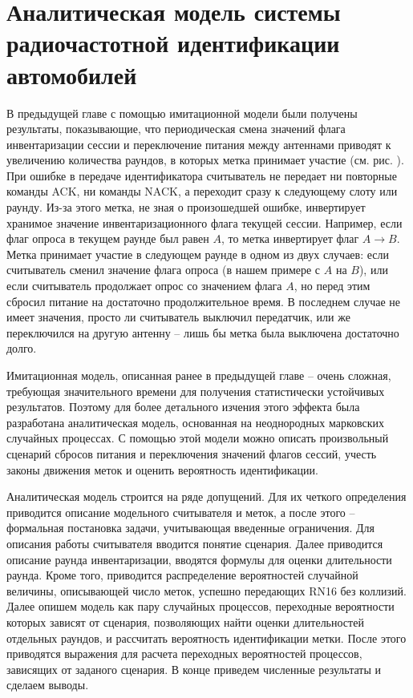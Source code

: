 \chapter{Аналитическая модель системы радиочастотной идентификации автомобилей}\label{ch:ch3}


В предыдущей главе с помощью имитационной модели были получены результаты, показывающие, что периодическая смена значений флага инвентаризации сессии и переключение питания между антеннами приводят к увеличению количества раундов, в которых метка принимает участие (см. рис. ). При ошибке в передаче идентификатора считыватель не передает ни повторные команды ACK, ни команды NACK, а переходит сразу к следующему слоту или раунду. Из-за этого метка, не зная о произошедшей ошибке, инвертирует хранимое значение инвентаризационного флага текущей сессии. Например, если флаг опроса в текущем раунде был равен $A$, то метка инвертирует флаг $A \rightarrow B$. Метка принимает участие в следующем раунде в одном из двух случаев: если считыватель сменил значение флага опроса (в нашем примере с $A$ на $B$), или если считыватель продолжает опрос со значением флага $A$, но перед этим сбросил питание на достаточно продолжительное время. В последнем случае не имеет значения, просто ли считыватель выключил передатчик, или же переключился на другую антенну -- лишь бы метка была выключена достаточно долго.

Имитационная модель, описанная ранее в предыдущей главе -- очень сложная, требующая значительного времени для получения статистически устойчивых результатов. Поэтому для более детального изчения этого эффекта была разработана аналитическая модель, основанная на неоднородных марковских случайных процессах. С помощью этой модели можно описать произвольный сценарий сбросов питания и переключения значений флагов сессий, учесть законы движения меток и оценить вероятность идентификации.

Аналитическая модель строится на ряде допущений. Для их четкого определения приводится описание модельного считывателя и меток, а после этого -- формальная постановка задачи, учитывающая введенные ограничения. Для описания работы считывателя вводится понятие сценария. Далее приводится описание раунда инвентаризации, вводятся формулы для оценки длительности раунда. Кроме того, приводится распределение вероятностей случайной величины, описывающей число меток, успешно передающих RN16 без коллизий. Далее опишем модель как пару случайных процессов, переходные вероятности которых зависят от сценария, позволяющих найти оценки длительностей отдельных раундов, и рассчитать вероятность идентификации метки. После этого приводятся выражения для расчета переходных вероятностей процессов, зависящих от заданого сценария. В конце приведем численные результаты и сделаем выводы.

